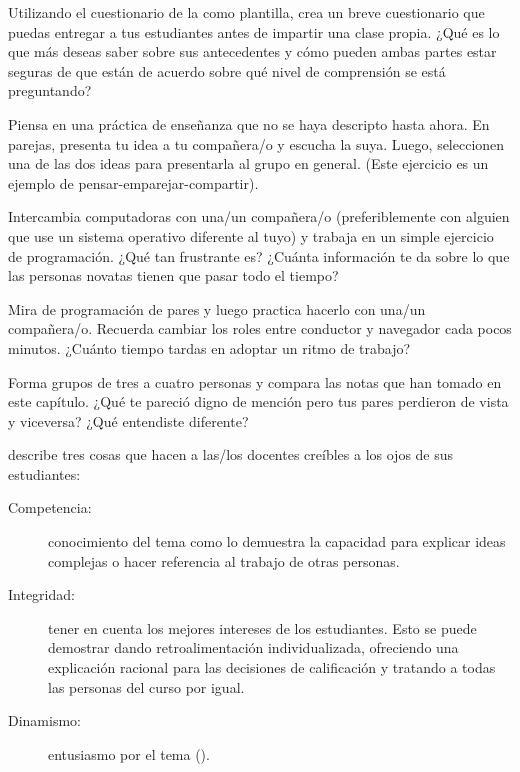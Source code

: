 Utilizando el cuestionario de la  como plantilla,
crea un breve cuestionario que puedas entregar a tus estudiantes antes de impartir una clase propia.
¿Qué es lo que más deseas saber sobre sus antecedentes
y cómo pueden ambas partes estar seguras de que están de acuerdo sobre qué nivel de comprensión se está preguntando?


Piensa en una práctica de enseñanza que no se haya descripto hasta ahora.
En parejas, presenta tu idea a tu compañera/o y escucha la suya. 
Luego, seleccionen una de las dos ideas para presentarla al grupo en general.
(Este ejercicio es un ejemplo de pensar-emparejar-compartir).


Intercambia computadoras con una/un compañera/o
(preferiblemente con alguien que use un sistema operativo diferente al tuyo)
y trabaja en un simple ejercicio de programación.
¿Qué tan frustrante es?
¿Cuánta información te da sobre lo que las personas novatas tienen que pasar todo el tiempo?


Mira  de programación de pares
y luego practica hacerlo con una/un compañera/o.
Recuerda cambiar los roles entre conductor y navegador cada pocos minutos.
¿Cuánto tiempo tardas en adoptar un ritmo de trabajo?


Forma grupos de tres a cuatro personas
y compara las notas que han tomado en este capítulo.
¿Qué te pareció digno de mención pero tus pares perdieron de vista y viceversa?
¿Qué entendiste diferente?


\cite{Fink2013} describe tres cosas
que hacen a las/los docentes creíbles a los ojos de sus estudiantes:

\begin{description}

\item[Competencia:]
  conocimiento del tema
  como lo demuestra la capacidad para explicar ideas complejas
  o hacer referencia al trabajo de otras personas.
 
\item[Integridad:]
  tener en cuenta los mejores intereses de los estudiantes.
  Esto se puede demostrar dando retroalimentación individualizada,
  ofreciendo una explicación racional para las decisiones de calificación
  y tratando a todas las personas del curso por igual.

\item[Dinamismo:]
  entusiasmo por el tema ().

\end{description}

